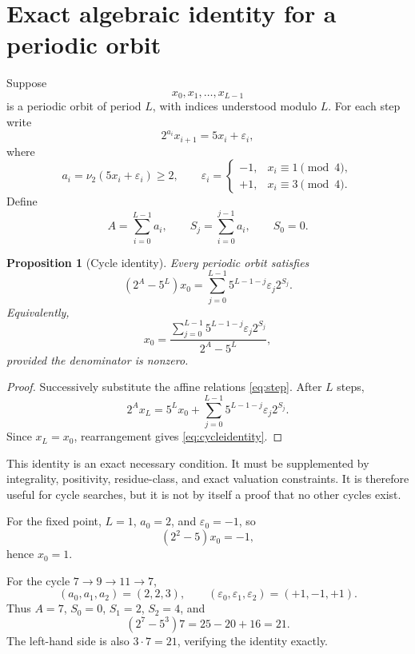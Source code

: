 \documentclass[11pt]{article}
\newtheorem{proposition}{Proposition}
\newcommand{\vTwo}{\nu_2}
\begin{document}
\section{Exact algebraic identity for a periodic orbit}

Suppose
\[
x_0,x_1,\ldots,x_{L-1}
\]
is a periodic orbit of period \(L\), with indices understood modulo \(L\). For each step write
\begin{equation}
2^{a_i}x_{i+1}=5x_i+\varepsilon_i,
\label{eq:step}
\end{equation}
where
\[
a_i=\vTwo(5x_i+\varepsilon_i)\ge2,\qquad
\varepsilon_i=
\begin{cases}
-1,&x_i\equiv1\pmod4,\\
+1,&x_i\equiv3\pmod4.
\end{cases}
\]
Define
\[
A=\sum_{i=0}^{L-1}a_i,\qquad
S_j=\sum_{i=0}^{j-1}a_i,\qquad S_0=0.
\]

\begin{proposition}[Cycle identity]
Every periodic orbit satisfies
\begin{equation}
(2^A-5^L)x_0
=
\sum_{j=0}^{L-1}
5^{L-1-j}\varepsilon_j2^{S_j}.
\label{eq:cycleidentity}
\end{equation}
Equivalently,
\begin{equation}
x_0=
\frac{\displaystyle\sum_{j=0}^{L-1}5^{L-1-j}\varepsilon_j2^{S_j}}
{2^A-5^L},
\label{eq:cycleclosed}
\end{equation}
provided the denominator is nonzero.
\end{proposition}

\begin{proof}
Successively substitute the affine relations \eqref{eq:step}. After \(L\) steps,
\[
2^A x_L
=
5^Lx_0+
\sum_{j=0}^{L-1}5^{L-1-j}\varepsilon_j2^{S_j}.
\]
Since \(x_L=x_0\), rearrangement gives \eqref{eq:cycleidentity}.
\end{proof}

This identity is an exact necessary condition. It must be supplemented by integrality, positivity, residue-class, and exact valuation constraints. It is therefore useful for cycle searches, but it is not by itself a proof that no other cycles exist.

For the fixed point, \(L=1\), \(a_0=2\), and \(\varepsilon_0=-1\), so
\[
(2^2-5) x_0=-1,
\]
hence \(x_0=1\).

For the cycle \(7\to9\to11\to7\),
\[
(a_0,a_1,a_2)=(2,2,3),\qquad
(\varepsilon_0,\varepsilon_1,\varepsilon_2)=(+1,-1,+1).
\]
Thus \(A=7\), \(S_0=0\), \(S_1=2\), \(S_2=4\), and
\[
(2^7-5^3)7
=25-20+16
=21.
\]
The left-hand side is also \(3\cdot7=21\), verifying the identity exactly.
\end{document}
